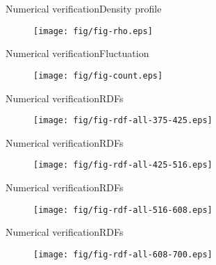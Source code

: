 \documentclass[]{beamer}
\begin{document}

\appendix

\begin{frame}{Numerical verification}{Density profile}
  \begin{figure}
    \centering 
    \texttt{[image: fig/fig-rho.eps]}
  \end{figure}  
\end{frame}

\begin{frame}{Numerical verification}{Fluctuation}
  \begin{figure}
    \centering 
    \texttt{[image: fig/fig-count.eps]}
  \end{figure}  
\end{frame}

\begin{frame}{Numerical verification}{RDFs}
  \begin{figure}
    \centering 
    \texttt{[image: fig/fig-rdf-all-375-425.eps]}
  \end{figure}  
\end{frame}

\begin{frame}{Numerical verification}{RDFs}
  \begin{figure}
    \centering 
    \texttt{[image: fig/fig-rdf-all-425-516.eps]}
  \end{figure}  
\end{frame}

\begin{frame}{Numerical verification}{RDFs}
  \begin{figure}
    \centering 
    \texttt{[image: fig/fig-rdf-all-516-608.eps]}
  \end{figure}  
\end{frame}

\begin{frame}{Numerical verification}{RDFs}
  \begin{figure}
    \centering 
    \texttt{[image: fig/fig-rdf-all-608-700.eps]}
  \end{figure}  
\end{frame}
\end{document}

